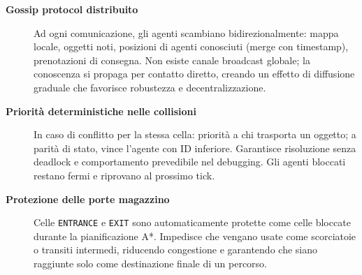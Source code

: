 \begin{description}
  \item[\textbf{Gossip protocol distribuito}]
        Ad ogni comunicazione, gli agenti scambiano bidirezionalmente: mappa locale, oggetti noti,
        posizioni di agenti conosciuti (merge con timestamp), prenotazioni di consegna.
        Non esiste canale broadcast globale; la conoscenza si propaga per contatto diretto,
        creando un effetto di diffusione graduale che favorisce robustezza e decentralizzazione.
  
  \item[\textbf{Priorit\`a deterministiche nelle collisioni}]
        In caso di conflitto per la stessa cella: priorità a chi trasporta un oggetto;
        a parità di stato, vince l'agente con ID inferiore. Garantisce risoluzione senza
        deadlock e comportamento prevedibile nel debugging. Gli agenti bloccati restano
        fermi e riprovano al prossimo tick.
  
  \item[\textbf{Protezione delle porte magazzino}]
        Celle \texttt{ENTRANCE} e \texttt{EXIT} sono automaticamente protette come celle bloccate
        durante la pianificazione A*. Impedisce che vengano usate come scorciatoie o transiti
        intermedi, riducendo congestione e garantendo che siano raggiunte solo come destinazione
        finale di un percorso.
\end{description}

